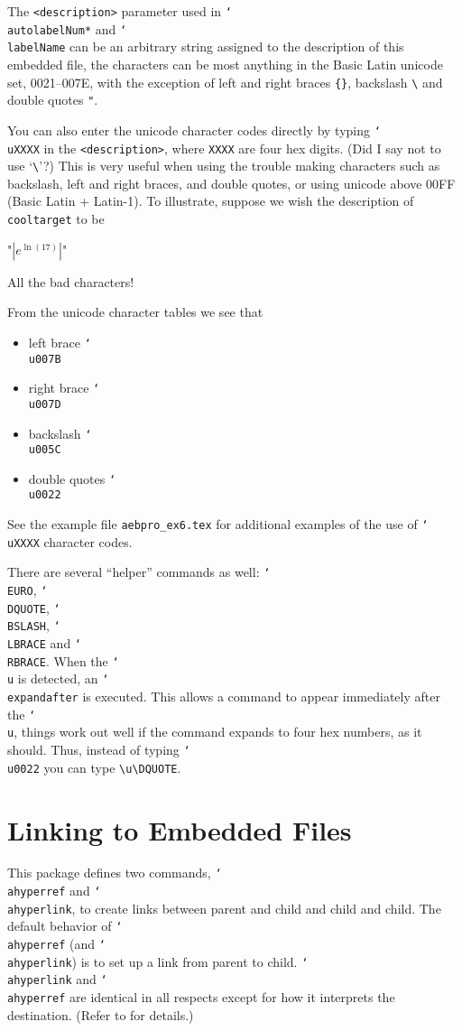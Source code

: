 \documentclass{article}
\newcommand{\cs}[1]{\texttt{\char`\\#1}}
\newcommand\newtopic{\par\ifdim\lastskip>0pt\relax\vskip-\lastskip\fi
\par\vskip6pt\noindent}
\def\aftersverbskip{\noindent}
\newenvironment{sverbatim}
{\par\small\verbatim}
{\endverbatim\par\aftergroup\aftersverbskip}
\begin{document}
\newtopic The \texttt{<description>} parameter used in
\cs{autolabelNum*} and \cs{labelName} can be an arbitrary string
assigned to the description of this embedded file, the characters
can be most anything in the Basic Latin unicode set, 0021--007E,
with the exception of left and right braces \verb!{}!, backslash
\verb!\! and double quotes \texttt{"}. 

You can also enter the unicode character codes directly by typing
\cs{uXXXX} in the \texttt{<description>}, where \texttt{XXXX} are four hex digits. (Did I say not
to use `\verb!\!'?) This is very useful when using the trouble making
characters such as backslash, left and right braces, and double
quotes, or using unicode above 00FF (Basic Latin + Latin-1). To illustrate, suppose we wish
the description of \texttt{cooltarget} to be
\begin{sverbatim}
    "$|e^{\ln(17)}|$"
\end{sverbatim}
All the bad characters!
\begin{sverbatim}
\end{sverbatim}
From the unicode character tables we see that
\begin{itemize}
\item  left brace \cs{u007B}
\item right brace \cs{u007D}
\item backslash \cs{u005C}
\item double quotes \cs{u0022}
\end{itemize}
See the example file \texttt{aebpro\_ex6.tex} for additional examples of the use
of \cs{uXXXX} character codes.

There are several ``helper'' commands as well: \cs{EURO}, \cs{DQUOTE}, \cs{BSLASH},
\cs{LBRACE} and \cs{RBRACE}. When the \cs{u} is detected, an \cs{expandafter} is executed.
This allows a command to appear immediately after the \cs{u}, things work out well if the
command expands to four hex numbers, as it should. Thus, instead of typing
\cs{u0022} you can type \verb!\u\DQUOTE!.

\section{Linking to Embedded Files}\label{embed}

This package defines two commands, \cs{ahyperref} and
\cs{ahyperlink}, to create links between parent and child and child
and child. The default behavior of \cs{ahyperref} (and
\cs{ahyperlink}) is to set up a link from parent to child.
\cs{ahyperlink} and \cs{ahyperref} are identical in all respects
except for how it interprets the destination. (Refer to
 for details.)
\end{document}
